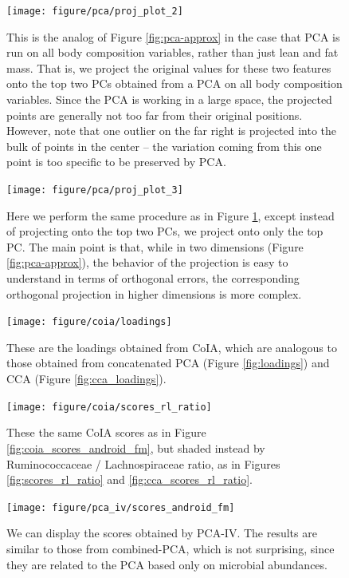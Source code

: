 \documentclass[14pt]{extarticle}
\begin{document}
\begin{figure}
  \texttt{[image: figure/pca/proj\_plot\_2]}
  \caption{This is the analog of Figure \ref{fig:pca-approx} in the case that
    PCA is run on all body composition variables, rather than just lean and
    fat mass. That is, we project the original values for these two features
    onto the top two PCs obtained from a PCA on all body composition variables.
    Since the PCA is working in a large space, the projected points are
    generally not too far from their original positions. However, note that one
    outlier on the far right is projected into the bulk of points in the center
    -- the variation coming from this one point is too specific to be preserved
    by PCA.
  \label{fig:pca-approx-2}}
\end{figure}

\begin{figure}
  \texttt{[image: figure/pca/proj\_plot\_3]}
  \caption{Here we perform the same procedure as in Figure
    \ref{fig:pca-approx-2}, except instead of projecting onto the top two PCs,
    we project onto only the top PC. The main point is that, while in two
    dimensions (Figure \ref{fig:pca-approx}), the behavior of the projection is
    easy to understand in terms of orthogonal errors, the corresponding
    orthogonal projection in higher dimensions is more complex.
  \label{fig:pca-approx-3}}
\end{figure}

\begin{figure}
  \centering \texttt{[image: figure/coia/loadings]}
  \caption{These are the loadings obtained from CoIA, which are analogous to
    those obtained from concatenated PCA (Figure \ref{fig:loadings}) and CCA
    (Figure \ref{fig:cca_loadings}). \label{fig:coia_loadings} }
\end{figure}

\begin{figure}
  \centering
  \texttt{[image: figure/coia/scores\_rl\_ratio]}
  \caption{These the same CoIA scores as in Figure \ref{fig:coia_scores_android_fm},
    but shaded instead by Ruminococcaceae / Lachnospiraceae ratio, as in Figures
    \ref{fig:scores_rl_ratio} and
    \ref{fig:cca_scores_rl_ratio}. \label{fig:coia_scores_rl_ratio} }
\end{figure}

\begin{figure}
  \centering
  \texttt{[image: figure/pca\_iv/scores\_android\_fm]}
  \caption{We can display the scores obtained by PCA-IV. The results are similar
    to those from combined-PCA, which is not surprising, since they are related
    to the PCA based only on microbial
    abundances. \label{fig:pca_iv_scores_android_fm} }
\end{figure}
\end{document}
